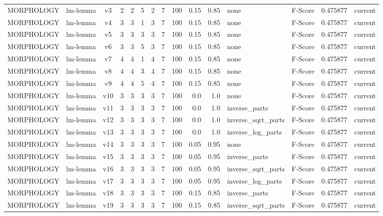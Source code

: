 \documentclass{article}
\begin{document}
\begin{xltabular}{\linewidth}{@{}lYcrrrrrrrrYlrl@{}}
MORPHOLOGY & lm-lemma & v3 & 2 & 2 & 5 & 2 & 7 & 100 & 0.15 & 0.85 & none & F-Score & 0.475877 & current \\
MORPHOLOGY & lm-lemma & v4 & 3 & 3 & 1 & 3 & 7 & 100 & 0.15 & 0.85 & none & F-Score & 0.475877 & current \\
MORPHOLOGY & lm-lemma & v5 & 3 & 3 & 3 & 3 & 7 & 100 & 0.15 & 0.85 & none & F-Score & 0.475877 & current \\
MORPHOLOGY & lm-lemma & v6 & 3 & 3 & 5 & 3 & 7 & 100 & 0.15 & 0.85 & none & F-Score & 0.475877 & current \\
MORPHOLOGY & lm-lemma & v7 & 4 & 4 & 1 & 4 & 7 & 100 & 0.15 & 0.85 & none & F-Score & 0.475877 & current \\
MORPHOLOGY & lm-lemma & v8 & 4 & 4 & 3 & 4 & 7 & 100 & 0.15 & 0.85 & none & F-Score & 0.475877 & current \\
MORPHOLOGY & lm-lemma & v9 & 4 & 4 & 5 & 4 & 7 & 100 & 0.15 & 0.85 & none & F-Score & 0.475877 & current \\
MORPHOLOGY & lm-lemma & v10 & 3 & 3 & 3 & 3 & 7 & 100 & 0.0 & 1.0 & none & F-Score & 0.475877 & current \\
MORPHOLOGY & lm-lemma & v11 & 3 & 3 & 3 & 3 & 7 & 100 & 0.0 & 1.0 & inverse\_parts & F-Score & 0.475877 & current \\
MORPHOLOGY & lm-lemma & v12 & 3 & 3 & 3 & 3 & 7 & 100 & 0.0 & 1.0 & inverse\_sqrt\_parts & F-Score & 0.475877 & current \\
MORPHOLOGY & lm-lemma & v13 & 3 & 3 & 3 & 3 & 7 & 100 & 0.0 & 1.0 & inverse\_log\_parts & F-Score & 0.475877 & current \\
MORPHOLOGY & lm-lemma & v14 & 3 & 3 & 3 & 3 & 7 & 100 & 0.05 & 0.95 & none & F-Score & 0.475877 & current \\
MORPHOLOGY & lm-lemma & v15 & 3 & 3 & 3 & 3 & 7 & 100 & 0.05 & 0.95 & inverse\_parts & F-Score & 0.475877 & current \\
MORPHOLOGY & lm-lemma & v16 & 3 & 3 & 3 & 3 & 7 & 100 & 0.05 & 0.95 & inverse\_sqrt\_parts & F-Score & 0.475877 & current \\
MORPHOLOGY & lm-lemma & v17 & 3 & 3 & 3 & 3 & 7 & 100 & 0.05 & 0.95 & inverse\_log\_parts & F-Score & 0.475877 & current \\
MORPHOLOGY & lm-lemma & v18 & 3 & 3 & 3 & 3 & 7 & 100 & 0.15 & 0.85 & inverse\_parts & F-Score & 0.475877 & current \\
MORPHOLOGY & lm-lemma & v19 & 3 & 3 & 3 & 3 & 7 & 100 & 0.15 & 0.85 & inverse\_sqrt\_parts & F-Score & 0.475877 & current \\

\end{xltabular}
\end{document}

